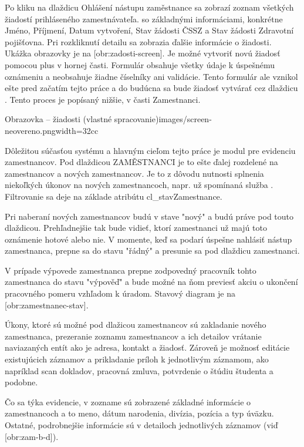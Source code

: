 Po kliku na dlaždicu Ohlášení nástupu zaměstnance sa zobrazí zoznam všetkých žiadostí prihláseného zamestnávateľa. so základnými informáciami, konkrétne Jméno, Příjmení, Datum vytvoření, Stav žádosti ČSSZ a Stav žádosti Zdravotní pojišťovna. Pri rozkliknutí detailu sa zobrazia ďalšie informácie o žiadosti. Ukážka obrazovky je na [obr:zadosti-screen]. Je možné vytvoriť novú žiadosť pomocou plus v hornej časti. Formulár obsahuje všetky údaje k úspešnému oznámeniu a neobsahuje žiadne číselníky ani validácie. Tento formulár ale vznikol ešte pred začatím tejto práce a do budúcna sa bude žiadosť vytvárať cez dlaždicu . Tento proces je popísaný nižšie, v časti Zamestnanci.

{Obrazovka -- žiadosti (vlastné spracovanie)}{images/screen-neovereno.png}{width=32cc}


Dôležitou súčasťou systému a hlavným cieľom tejto práce je modul pre evidenciu zamestnancov. Pod dlaždicou ZAMĚSTNANCI je to ešte ďalej rozdelené na zamestnancov a nových zamestnancov. Je to z dôvodu nutnosti splnenia niekoľkých úkonov na nových zamestnancoch, napr. už spomínaná služba . Filtrovanie sa deje na základe atribútu cl_stavZamestnance.

Pri naberaní nových zamestnancov budú v stave "nový" a budú práve pod touto dlaždicou. Prehľadnejšie tak bude vidieť, ktorí zamestnanci už majú toto oznámenie hotové alebo nie. V momente, keď sa podarí úspešne nahlásiť nástup zamestnanca, prepne sa do stavu "řádný" a presunie sa pod dlaždicu zamestnanci.

V prípade výpovede zamestnanca prepne zodpovedný pracovník tohto zamestnanca do stavu "výpověď" a bude možné na ňom previesť akciu o ukončení pracovného pomeru vzhľadom k úradom. Stavový diagram je na [obr:zamestnanec-stav].

Úkony, ktoré sú možné pod dlažicou zamestnancov sú zakladanie nového zamestnanca, prezeranie zoznamu zamestnancov a ich detailov vrátanie naviazaných entít ako je adresa, kontakt a žiadosť. Zároveň je možnosť editácie existujúcich záznamov a prikladanie príloh k jednotlivým záznamom, ako napríklad scan dokladov, pracovná zmluva, potvrdenie o štúdiu študenta a podobne.

Čo sa týka evidencie, v zozname sú zobrazené základné informácie o zamestnancoch a to meno, dátum narodenia, divízia, pozícia a typ úväzku. Ostatné, podrobnejšie informácie sú v detailoch jednotlivých záznamov (viď [obr:zam-b-d]).

